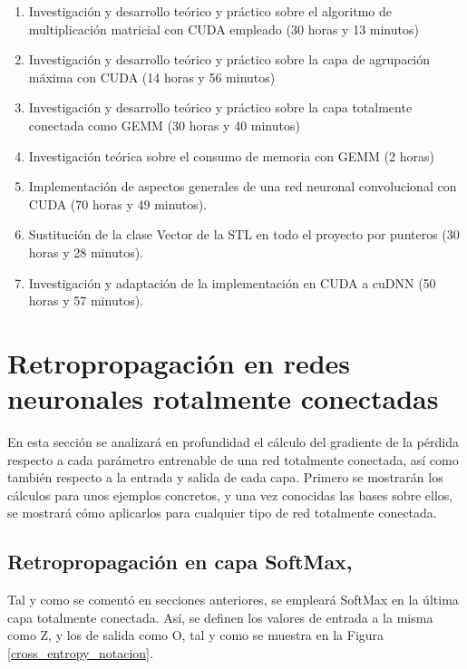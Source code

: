 \begin{enumerate}[label=\textbullet]
\begin{enumerate}[label=\textbullet]
		\item Investigación y desarrollo teórico y práctico sobre el algoritmo de multiplicación matricial con CUDA empleado (30 horas y 13 minutos)
		\item Investigación y desarrollo teórico y práctico sobre la capa de agrupación máxima con CUDA (14 horas y 56 minutos)
		\item Investigación y desarrollo teórico y práctico sobre la capa totalmente conectada como GEMM (30 horas y 40 minutos)
		\item Investigación teórica sobre el consumo de memoria con GEMM (2 horas)
		\item Implementación de aspectos generales de una red neuronal convolucional con CUDA (70 horas y 49 minutos).
		\item Sustitución de la clase Vector de la STL en todo el proyecto por punteros (30 horas y 28 minutos).
		\item Investigación y adaptación de la implementación en CUDA a cuDNN (50 horas y 57 minutos).
	\end{enumerate}
	
\end{enumerate}

\section{Retropropagación en redes neuronales rotalmente conectadas}

En esta sección se analizará en profundidad el cálculo del gradiente de la pérdida respecto a cada parámetro entrenable de una red totalmente conectada, así como también respecto a la entrada y salida de cada capa. Primero se mostrarán los cálculos para unos ejemplos concretos, y una vez conocidas las bases sobre ellos, se mostrará cómo aplicarlos para cualquier tipo de red totalmente conectada. 

\subsection{Retropropagación en capa SoftMax, \cite{Cross_entropy_backprop} \cite{Cross_entropy_backprop_grad_input}} 

Tal y como se comentó en secciones anteriores, se empleará SoftMax en la última capa totalmente conectada. Así, se definen los valores de entrada a la misma como Z, y los de salida como O, tal y como se muestra en la Figura \ref{cross_entropy_notacion}.

